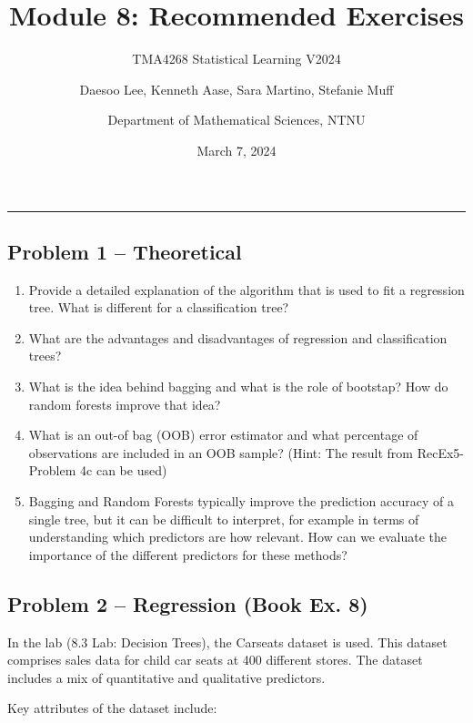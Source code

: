 \documentclass[
]{article}
\title{Module 8: Recommended Exercises}
\subtitle{TMA4268 Statistical Learning V2024}
\author{Daesoo Lee, Kenneth Aase, Sara Martino, Stefanie
Muff \and Department of Mathematical Sciences, NTNU}
\date{March 7, 2024}
\begin{document}
\maketitle

\begin{center}\rule{0.5\linewidth}{0.5pt}\end{center}

\hypertarget{problem-1-theoretical}{%
\subsection{Problem 1 -- Theoretical}\label{problem-1-theoretical}}

\begin{enumerate}
\def\labelenumi{\alph{enumi})}
\item
  Provide a detailed explanation of the algorithm that is used to fit a
  regression tree. What is different for a classification tree?
\item
  What are the advantages and disadvantages of regression and
  classification trees?
\item
  What is the idea behind bagging and what is the role of bootstap? How
  do random forests improve that idea?
\item
  What is an out-of bag (OOB) error estimator and what percentage of
  observations are included in an OOB sample? (Hint: The result from
  RecEx5-Problem 4c can be used)
\item
  Bagging and Random Forests typically improve the prediction accuracy
  of a single tree, but it can be difficult to interpret, for example in
  terms of understanding which predictors are how relevant. How can we
  evaluate the importance of the different predictors for these methods?
\end{enumerate}

\hypertarget{problem-2-regression-book-ex.-8}{%
\subsection{Problem 2 -- Regression (Book Ex.
8)}\label{problem-2-regression-book-ex.-8}}

In the lab (8.3 Lab: Decision Trees), the Carseats dataset is used. This
dataset comprises sales data for child car seats at 400 different
stores. The dataset includes a mix of quantitative and qualitative
predictors.

Key attributes of the dataset include:
\end{document}
